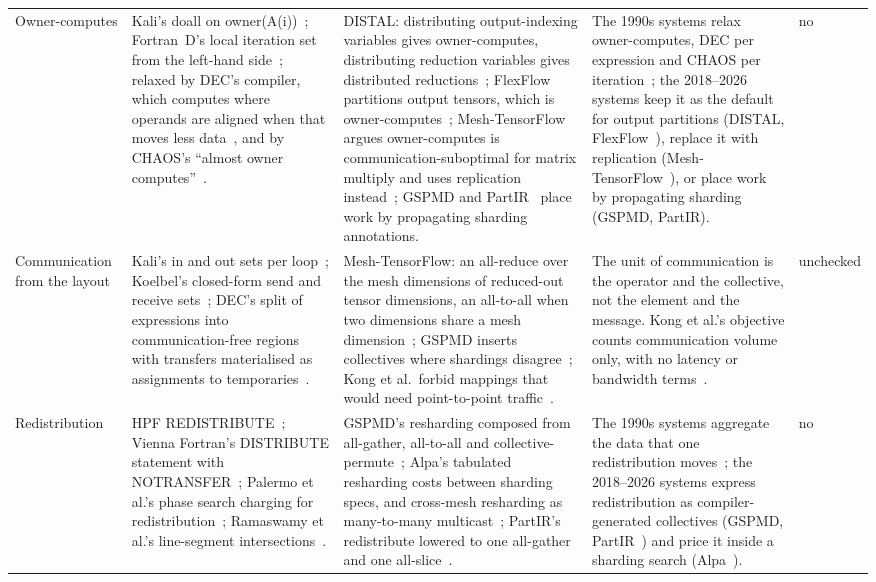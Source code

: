 \begin{table}[t]
\begin{tabular}{p{}p{}p{}p{}p{}}
Owner-computes & Kali's doall on owner(A(i))~\cite{mehrotra1990kali}; Fortran~D's local iteration set from the left-hand side~\cite{hiranandani1991fortrand}; relaxed by DEC's compiler, which computes where operands are aligned when that moves less data~\cite{harris1995dechpf}, and by CHAOS's ``almost owner computes''~\cite{ponnusamy1995runtime}. & DISTAL: distributing output-indexing variables gives owner-computes, distributing reduction variables gives distributed reductions~\cite{yadav2022distal}; FlexFlow partitions output tensors, which is owner-computes~\cite{jia2019flexflow}; Mesh-TensorFlow argues owner-computes is communication-suboptimal for matrix multiply and uses replication instead~\cite{shazeer2018meshtf}; GSPMD and PartIR~\cite{xu2021gspmd,alabed2025partir} place work by propagating sharding annotations. & The 1990s systems relax owner-computes, DEC per expression and CHAOS per iteration~\cite{harris1995dechpf,ponnusamy1995runtime}; the 2018--2026 systems keep it as the default for output partitions (DISTAL, FlexFlow~\cite{yadav2022distal,jia2019flexflow}), replace it with replication (Mesh-TensorFlow~\cite{shazeer2018meshtf}), or place work by propagating sharding (GSPMD, PartIR). & no \\
Communication from the layout & Kali's in and out sets per loop~\cite{mehrotra1990kali}; Koelbel's closed-form send and receive sets~\cite{koelbel1991regular}; DEC's split of expressions into communication-free regions with transfers materialised as assignments to temporaries~\cite{harris1995dechpf}. & Mesh-TensorFlow: an all-reduce over the mesh dimensions of reduced-out tensor dimensions, an all-to-all when two dimensions share a mesh dimension~\cite{shazeer2018meshtf}; GSPMD inserts collectives where shardings disagree~\cite{xu2021gspmd}; Kong et al.\ forbid mappings that would need point-to-point traffic~\cite{kong2023automatic}. & The unit of communication is the operator and the collective, not the element and the message. Kong et al.'s objective counts communication volume only, with no latency or bandwidth terms~\cite{kong2023automatic}. & unchecked \\
Redistribution & HPF REDISTRIBUTE~\cite{loveman1993hpf}; Vienna Fortran's DISTRIBUTE statement with NOTRANSFER~\cite{chapman1991vienna}; Palermo et al.'s phase search charging for redistribution~\cite{palermo1996dynamic}; Ramaswamy et al.'s line-segment intersections~\cite{ramaswamy1996redistribution}. & GSPMD's resharding composed from all-gather, all-to-all and collective-permute~\cite{xu2021gspmd}; Alpa's tabulated resharding costs between sharding specs, and cross-mesh resharding as many-to-many multicast~\cite{zheng2022alpa}; PartIR's redistribute lowered to one all-gather and one all-slice~\cite{alabed2025partir}. & The 1990s systems aggregate the data that one redistribution moves~\cite{palermo1996dynamic,ramaswamy1996redistribution}; the 2018--2026 systems express redistribution as compiler-generated collectives (GSPMD, PartIR~\cite{xu2021gspmd,alabed2025partir}) and price it inside a sharding search (Alpa~\cite{zheng2022alpa}). & no \\

\end{tabular}
\end{table}
